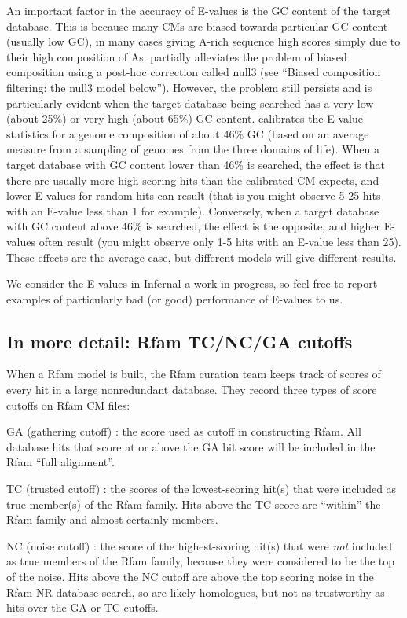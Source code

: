 An important factor in the accuracy of E-values is the GC content of
the target database. This is because many CMs are biased towards
particular GC content (usually low GC), in many cases giving A-rich
sequence high scores simply due to their high composition of
As.  partially alleviates the problem of biased
composition using a post-hoc correction called null3 (see ``Biased
composition filtering: the null3 model below''). However, the problem
still persists and is particularly evident when the target database
being searched has a very low (about 25\%) or very high (about 65\%)
GC content.  calibrates the E-value statistics for a
genome composition of about 46\% GC (based on an average measure from
a sampling of genomes from the three domains of life). When a target
database with GC content lower than 46\% is searched, the effect is
that there are usually more high scoring hits than the calibrated CM
expects, and lower E-values for random hits can result (that is you
might observe 5-25 hits with an E-value less than 1 for
example). Conversely, when a target database with GC content above
46\% is searched, the effect is the opposite, and higher E-values
often result (you might observe only 1-5 hits with an E-value less than
25). These effects are the average case, but different models will
give different results. 

We consider the E-values in Infernal a
work in progress, so feel free to report examples of particularly bad
(or good) performance of E-values to us.

\subsection{In more detail: Rfam TC/NC/GA cutoffs}

When a Rfam model is built, the Rfam curation team keeps track of
scores of every hit in a large nonredundant database. They record
three types of score cutoffs on Rfam CM files:

\begin{wideitem}
\item[GA (gathering cutoff)]: the score used as cutoff in
constructing Rfam. All database hits that score at or above the 
GA bit score will be included in the Rfam ``full alignment''.

\item[TC (trusted cutoff)]: the scores of the lowest-scoring hit(s)
that were included as true member(s) of the Rfam family. Hits above
the TC score are ``within'' the Rfam family and almost certainly
members.

\item[NC (noise cutoff)]: the score of the highest-scoring hit(s) that
were \textit{not} included as true members of the Rfam family, because
they were considered to be the top of the noise.  Hits above the NC
cutoff are above the top scoring noise in the Rfam NR database search,
so are likely homologues, but not as trustworthy as hits over the GA
or TC cutoffs.
\end{wideitem}

